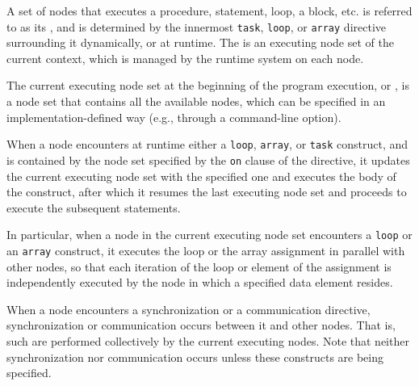 


A set of nodes that executes a procedure, statement, loop,
a block, etc. is referred to as its {\it {}}, and is
determined by the innermost {\tt task}, {\tt loop}, or {\tt array}
directive surrounding it dynamically, or at runtime.
%
The {\it {}} is an executing node set of
the current context, which is managed by the {\XMP} runtime system on
each node.


The current executing node set at the beginning of the program
execution, or {\it {}}, is a node set that
contains all the available nodes, which can be specified in an 
implementation-defined way (e.g., through a command-line option).
%

When a node encounters at runtime either a {\tt loop}, {\tt array}, or
{\tt task} construct, and is contained by the node set specified by the
{\tt on} clause of the directive, it updates the current executing node
set with the specified one and executes the body of the construct, after
which it resumes the last executing node set and proceeds to execute the
subsequent statements.

In particular, when a node in the current executing node set encounters a
{\tt loop} or an {\tt array} construct, it executes the loop or the array
assignment in parallel with other nodes, so that each iteration of the
loop or element of the assignment is independently executed by the node
in which a specified data element resides.

When a node encounters a synchronization or a communication directive,
synchronization or communication occurs between it and other nodes.
%
That is, such {\it {}} are performed collectively
by the current executing nodes.
%
Note that neither synchronization nor communication occurs unless these
constructs are being specified.


